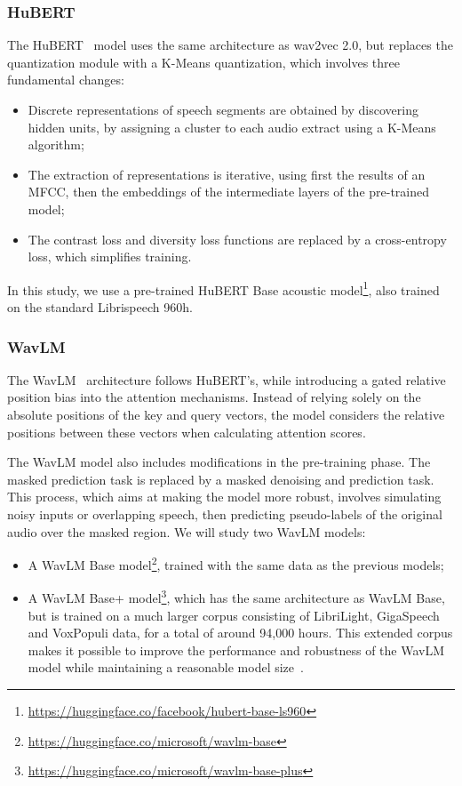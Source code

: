 \documentclass{Interspeech2024}
\begin{document}
\subsubsection{HuBERT}

The HuBERT~\cite{hsu2021hubert} model uses the same architecture as wav2vec 2.0, but replaces the quantization module with a K-Means quantization, which involves three fundamental changes:
\begin{itemize}
    \item Discrete representations of speech segments are obtained by discovering hidden units, by assigning a cluster to each audio extract using a K-Means algorithm;
    \item The extraction of representations is iterative, using first the results of an MFCC, then the embeddings of the intermediate layers of the pre-trained model;
    \item The contrast loss and diversity loss functions are replaced by a cross-entropy loss, which simplifies training.
\end{itemize}

In this study, we use a pre-trained HuBERT Base acoustic model\footnote{\scriptsize\url{https://huggingface.co/facebook/hubert-base-ls960}}, also trained on the standard Librispeech 960h.

\subsubsection{WavLM}

The WavLM~\cite{Chen2022-wavlm} architecture follows HuBERT's, while introducing a gated relative position bias into the attention mechanisms. Instead of relying solely on the absolute positions of the key and query vectors, the model considers the relative positions between these vectors when calculating attention scores.

The WavLM model also includes modifications in the pre-training phase. The masked prediction task is replaced by a masked denoising and prediction task. This process, which aims at making the model more robust, involves simulating noisy inputs or overlapping speech, then predicting pseudo-labels of the original audio over the masked region.
We will study two WavLM models:
\begin{itemize}
    \item A WavLM Base model\footnote{\scriptsize\url{https://huggingface.co/microsoft/wavlm-base}}, trained with the same data as the previous models;
    \item A WavLM Base+ model\footnote{\scriptsize\url{https://huggingface.co/microsoft/wavlm-base-plus}}, which has the same architecture as WavLM Base, but is trained on a much larger corpus consisting of LibriLight, GigaSpeech and VoxPopuli data, for a total of around 94,000 hours. This extended corpus makes it possible to improve the performance and robustness of the WavLM model while maintaining a reasonable model size~\cite{Chen2022-wavlm}.
\end{itemize}
\end{document}
